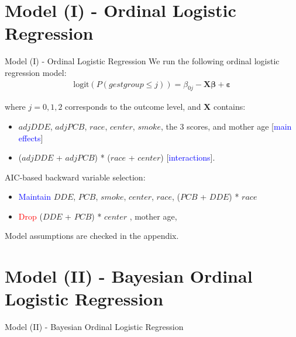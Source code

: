 \documentclass{beamer}\usepackage[]{graphicx}\usepackage[]{color}
\begin{document}
\section{Model (I) - Ordinal Logistic Regression}
\begin{frame}{Model (I) - Ordinal Logistic Regression}
We run the following ordinal logistic regression model:
\begin{align*}
	\textrm{logit}(P(gestgroup \leq j)) = \beta_{0j} - \mathbf{X} \boldsymbol{\beta} + \boldsymbol{\varepsilon}
\end{align*}

where $j = 0,1,2$ corresponds to the outcome level, and \textbf{X} contains:
\begin{itemize}
	\item $adjDDE$, $adjPCB$, $race$, $center$, $smoke$, the 3 scores, and mother age [\textcolor{blue}{main effects}]
	\item ($adjDDE$ + $adjPCB$) * ($race$ + $center$) [\textcolor{blue}{interactions}].
\end{itemize}
\medskip
AIC-based backward variable selection:
\begin{itemize}
	\item \textcolor{blue}{Maintain} $DDE$, $PCB$, $smoke$, $center$, $race$, ($PCB$ + $DDE$) * $race$
	\item \textcolor{red}{Drop} ($DDE$ + $PCB$) * $center$ , mother age, 
\end{itemize}

Model assumptions are checked in the appendix.
\end{frame}


\section{Model (II) - Bayesian Ordinal Logistic Regression}
\begin{frame}{Model (II) - Bayesian Ordinal Logistic Regression}
\end{frame}

\end{document}
